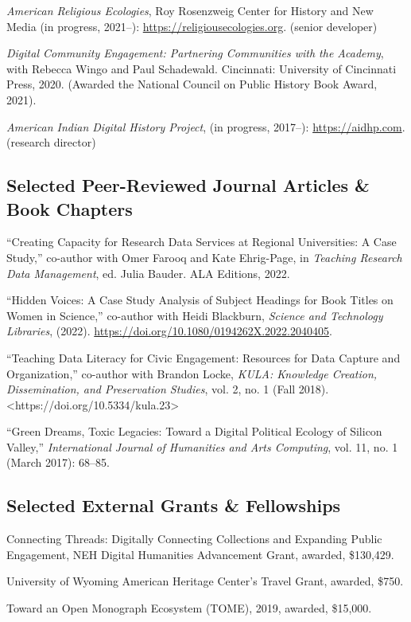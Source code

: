 \documentclass[10pt]{article}
\begin{document}
\emph{American Religious Ecologies}, Roy Rosenzweig Center for History and New Media (in progress, 2021--): \url{https://religiousecologies.org}. (senior developer)

\textit{Digital Community Engagement: Partnering Communities with the Academy}, with Rebecca Wingo and Paul Schadewald. Cincinnati: University of Cincinnati Press, 2020. (Awarded the National Council on Public History Book Award, 2021).

\emph{American Indian Digital History Project}, (in progress, 2017--): \url{https://aidhp.com}. (research director)

\subsection{Selected Peer-Reviewed Journal Articles \& Book Chapters}\label{peer-reviewed}

``Creating Capacity for Research Data Services at Regional Universities: A Case Study,'' co-author with Omer Farooq and Kate Ehrig-Page, in \emph{Teaching Research Data Management}, ed. Julia Bauder. ALA Editions, 2022.

``Hidden Voices: A Case Study Analysis of Subject Headings for Book Titles on Women in Science,'' co-author with Heidi Blackburn, \textit{Science and Technology Libraries}, (2022). \url{https://doi.org/10.1080/0194262X.2022.2040405}.

``Teaching Data Literacy for Civic Engagement: Resources for Data Capture and Organization,'' co-author with Brandon Locke, \textit{KULA: Knowledge Creation, Dissemination, and Preservation Studies}, vol. 2, no. 1 (Fall 2018). <https://doi.org/10.5334/kula.23>

``Green Dreams, Toxic Legacies: Toward a Digital Political Ecology of Silicon Valley,'' \textit{International Journal of Humanities and Arts Computing}, vol. 11, no. 1 (March 2017): 68--85.

\subsection{Selected External Grants \& Fellowships}\label{grants-and-fellowships}

Connecting Threads: Digitally Connecting Collections and Expanding Public Engagement, NEH Digital Humanities Advancement Grant, awarded, \$130,429.

University of Wyoming American Heritage Center's Travel Grant, awarded, \$750.

Toward an Open Monograph Ecosystem (TOME), 2019, awarded, \$15,000.
\end{document}
